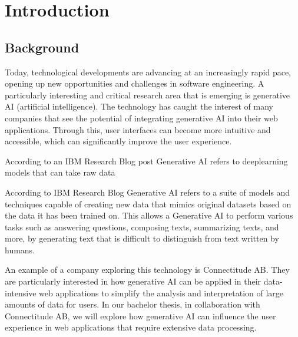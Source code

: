 \chapter{Introduction}
\label{chp:introduction}  %

\section{Background}
Today, technological developments are advancing at an increasingly rapid pace, opening up new opportunities and challenges in software engineering. A particularly interesting and critical research area that is emerging is generative AI (artificial intelligence). The technology has caught the interest of many companies that see the potential of integrating generative AI into their web applications. Through this, user interfaces can become more intuitive and accessible, which can significantly improve the user experience.

According to an IBM Research Blog post \cite{ibmGenerativeAI} Generative AI refers to deeplearning models that can take raw data 

According to IBM Research Blog \cite{ibmGenerativeAI} Generative AI refers to a suite of models and techniques capable of creating new data that mimics original datasets based on the data it has been trained on. This allows a Generative AI to perform various tasks such as answering questions, composing texts, summarizing texts, and more, by generating text that is difficult to distinguish from text written by humans.

An example of a company exploring this technology is Connectitude AB. They are particularly interested in how generative AI can be applied in their data-intensive web applications to simplify the analysis and interpretation of large amounts of data for users. In our bachelor thesis, in collaboration with Connectitude AB, we will explore how generative AI can influence the user experience in web applications that require extensive data processing.

\begin{comment}
    Our goal is to identify both the positive and negative aspects of employing generative AI in settings that demand significant data handling, particularly those relating to certain aspects of user experience, such as usability(learnability, understandability) and efficiency.
\end{comment}

